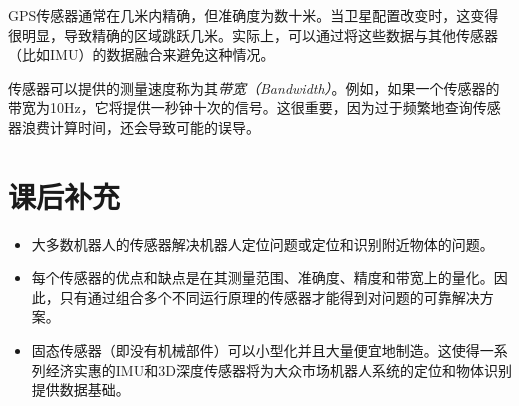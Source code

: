 GPS传感器通常在几米内精确，但准确度为数十米。当卫星配置改变时，这变得很明显，导致精确的区域跳跃几米。实际上，可以通过将这些数据与其他传感器（比如IMU）的数据融合来避免这种情况。


传感器可以提供的测量速度称为其\emph{带宽（Bandwidth）}。例如，如果一个传感器的带宽为10Hz，它将提供一秒钟十次的信号。这很重要，因为过于频繁地查询传感器浪费计算时间，还会导致可能的误导。

\section*{课后补充}
\begin{itemize}

\item 大多数机器人的传感器解决机器人定位问题或定位和识别附近物体的问题。
\item 每个传感器的优点和缺点是在其测量范围、准确度、精度和带宽上的量化。因此，只有通过组合多个不同运行原理的传感器才能得到对问题的可靠解决方案。
\item 固态传感器（即没有机械部件）可以小型化并且大量便宜地制造。这使得一系列经济实惠的IMU和3D深度传感器将为大众市场机器人系统的定位和物体识别提供数据基础。
\end{itemize} 

